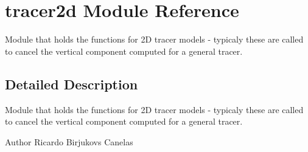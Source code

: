 \hypertarget{namespacetracer2d}{}\section{tracer2d Module Reference}
\label{namespacetracer2d}


Module that holds the functions for 2D tracer models -\/ typicaly these are called to cancel the vertical component computed for a general tracer.  




\subsection{Detailed Description}
Module that holds the functions for 2D tracer models -\/ typicaly these are called to cancel the vertical component computed for a general tracer. 

\begin{DoxyAuthor}{Author}
Ricardo Birjukovs Canelas 
\end{DoxyAuthor}
